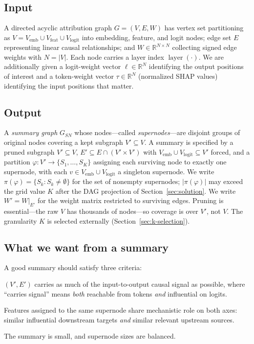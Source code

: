 \documentclass[table, 11pt]{article}
\DeclareMathOperator{\layer}{layer}
\begin{document}
\subsection{Input}\label{sec:input}

A directed acyclic attribution graph $G = (V, E, W)$ has vertex set
partitioning as $V = V_{\text{emb}} \cup V_{\text{feat}} \cup
V_{\text{logit}}$ into embedding, feature, and logit nodes; edge set
$E$ representing linear causal relationships; and $W \in
\mathbb{R}^{N \times N}$ collecting signed edge weights with $N =
|V|$. Each node carries a layer index $\layer(\cdot)$. We are
additionally given a logit-weight vector $\ell \in \mathbb{R}^N$
identifying the output positions of interest and a token-weight
vector $\tau \in \mathbb{R}^N$ (normalized SHAP values) identifying
the input positions that matter.

\subsection{Output}\label{sec:output}

A \emph{summary graph} $G_{SN}$ whose nodes---called
\emph{supernodes}---are disjoint groups of original nodes covering a
kept subgraph $V' \subseteq V$. A summary is specified by a pruned
subgraph $V' \subseteq V$, $E' \subseteq E \cap (V' \times V')$ with
$V_{\text{emb}} \cup V_{\text{logit}} \subseteq V'$ forced, and a
partition $\varphi : V' \to \{S_1, \ldots, S_K\}$ assigning each
surviving node to exactly one supernode, with each $v \in
V_{\text{emb}} \cup V_{\text{logit}}$ a singleton supernode. We write
$\pi(\varphi) = \{S_k : S_k \ne \emptyset\}$ for the set of nonempty
supernodes; $|\pi(\varphi)|$ may exceed the grid value $K$ after the
DAG projection of Section~\ref{sec:solution}. We write $W' = W|_{E'}$
for the weight matrix restricted to surviving edges. Pruning is
essential---the raw $V$ has thousands of nodes---so coverage is over
$V'$, not $V$. The granularity $K$ is selected externally
(Section~\ref{sec:k-selection}).

\subsection{What we want from a summary}\label{sec:desiderata}

A good summary should satisfy three criteria:
\begin{description}[leftmargin=2.2em,style=nextline,topsep=2pt,itemsep=2pt]
\item[(C1) Faithfulness.] $(V', E')$ carries as much of the
input-to-output causal signal as possible, where ``carries signal''
means \emph{both} reachable from tokens \emph{and} influential on
logits.
\item[(C2) Coherence.] Features assigned to the same supernode share
mechanistic role on both axes: similar influential downstream
targets \emph{and} similar relevant upstream sources.
\item[(C3) Readability.] The summary is small, and supernode sizes
are balanced.
\end{description}
\end{document}

